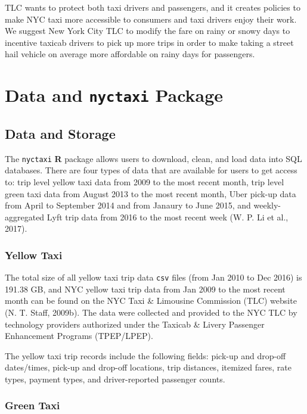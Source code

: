 \documentclass[12pt,twoside]{reedthesis}
\theoremstyle{definition}
\theoremstyle{definition}
\theoremstyle{definition}
\theoremstyle{remark}
\begin{document}
TLC wants to protect both taxi drivers and passengers, and it creates
policies to make NYC taxi more accessible to consumers and taxi drivers
enjoy their work. We suggest New York City TLC to modify the fare on
rainy or snowy days to incentive taxicab drivers to pick up more trips
in order to make taking a street hail vehicle on average more affordable
on rainy days for passengers.

\chapter{\texorpdfstring{Data and \texttt{nyctaxi}
Package}{Data and nyctaxi Package}}\label{chapter2}

\section{Data and Storage}\label{data-and-storage}

The \texttt{nyctaxi} \textbf{R} package allows users to download, clean,
and load data into SQL databases. There are four types of data that are
available for users to get access to: trip level yellow taxi data from
2009 to the most recent month, trip level green taxi data from August
2013 to the most recent month, Uber pick-up data from April to September
2014 and from Janaury to June 2015, and weekly-aggregated Lyft trip data
from 2016 to the most recent week (W. P. Li et al., 2017).

\subsection{Yellow Taxi}\label{yellow-taxi-1}

The total size of all yellow taxi trip data \texttt{csv} files (from Jan
2010 to Dec 2016) is 191.38 GB, and NYC yellow taxi trip data from Jan
2009 to the most recent month can be found on the NYC Taxi \& Limousine
Commission (TLC) website (N. T. Staff, 2009b). The data were collected
and provided to the NYC TLC by technology providers authorized under the
Taxicab \& Livery Passenger Enhancement Programs (TPEP/LPEP).

The yellow taxi trip records include the following fields: pick-up and
drop-off dates/times, pick-up and drop-off locations, trip distances,
itemized fares, rate types, payment types, and driver-reported passenger
counts.

\subsection{Green Taxi}\label{green-taxi-1}
\end{document}
